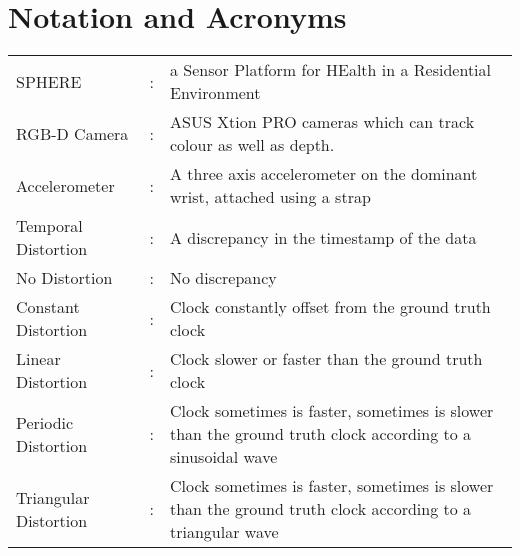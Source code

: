\chapter*{Notation and Acronyms}
%

\begin{tabular}{lcl}
	SPHERE &:     			& a Sensor Platform for HEalth in a Residential Environment \\
	RGB-D Camera &:     	& ASUS Xtion PRO cameras which can track colour as well as depth. \\
	Accelerometer &:     	& A three axis accelerometer on the dominant wrist, attached using a strap \\
    Temporal Distortion &:  & A discrepancy in the timestamp of the data \\
    No Distortion &:     	& No discrepancy \\
    Constant Distortion &:  & Clock constantly offset from the ground truth clock \\
    Linear Distortion &:    & Clock slower or faster than the ground truth clock \\
    Periodic Distortion &:  & Clock sometimes is faster, sometimes is slower than the ground truth clock according to a sinusoidal wave \\
    Triangular Distortion &:& Clock sometimes is faster, sometimes is slower than the ground truth clock according to a triangular wave \\
\end{tabular}
